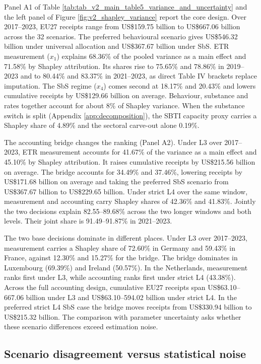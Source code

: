 \documentclass[11pt,a4paper]{article}
\newcommand{\usd}{US\$}
\begin{document}
Panel A1 of Table \ref{tab:tab_v2_main_table5_variance_and_uncertainty} and the left panel of Figure \ref{fig:v2_shapley_variance} report the core design. Over 2017–2023, EU27 receipts range from \usd159.75 billion to \usd667.06 billion across the 32 scenarios. The preferred behavioural scenario gives \usd546.32 billion under universal allocation and \usd367.67 billion under SbS. ETR measurement ($x_1$) explains 68.36\% of the pooled variance as a main effect and 71.58\% by Shapley attribution. Its shares rise to 75.65\% and 78.86\% in 2019–2023 and to 80.44\% and 83.37\% in 2021–2023, as direct Table IV brackets replace imputation. The SbS regime ($x_4$) comes second at 18.17\% and 20.43\% and lowers cumulative receipts by \usd129.66 billion on average. Behaviour, substance and rates together account for about 8\% of Shapley variance. When the substance switch is split (Appendix \ref{app:decomposition}), the SBTI capacity proxy carries a Shapley share of 4.89\% and the sectoral carve-out alone 0.19\%.

The accounting bridge changes the ranking (Panel A2). Under L3 over 2017–2023, ETR measurement accounts for 41.67\% of the variance as a main effect and 45.10\% by Shapley attribution. It raises cumulative receipts by \usd215.56 billion on average. The bridge accounts for 34.49\% and 37.46\%, lowering receipts by \usd171.68 billion on average and taking the preferred SbS scenario from \usd367.67 billion to \usd229.65 billion. Under strict L4 over the same window, measurement and accounting carry Shapley shares of 42.36\% and 41.83\%. Jointly the two decisions explain 82.55–89.68\% across the two longer windows and both levels. Their joint share is 91.49–91.87\% in 2021–2023.

The two base decisions dominate in different places. Under L3 over 2017–2023, measurement carries a Shapley share of 72.60\% in Germany and 59.43\% in France, against 12.30\% and 15.27\% for the bridge. The bridge dominates in Luxembourg (69.39\%) and Ireland (50.57\%). In the Netherlands, measurement ranks first under L3, while accounting ranks first under strict L4 (43.38\%). Across the full accounting design, cumulative EU27 receipts span \usd63.10–667.06 billion under L3 and \usd63.10–594.02 billion under strict L4. In the preferred strict L4 SbS case the bridge moves receipts from \usd330.94 billion to \usd215.32 billion. The comparison with parameter uncertainty asks whether these scenario differences exceed estimation noise.

\subsection{Scenario disagreement versus statistical noise}\label{sec:uncertainty}
\end{document}

